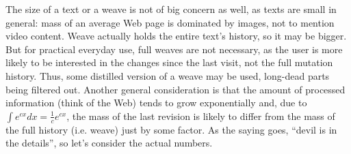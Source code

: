 \documentclass{acm_proc_article-sp}
\begin{document}
The size of a text or a weave is not of big concern as well,
as texts are small in general: mass of an average Web page
is dominated by images, not to mention video content.
Weave actually holds the entire text's history, so it may
be bigger. But for practical everyday use, full weaves are
not necessary, as the user is more likely to be interested
in the changes since the last visit, not the full mutation
history. Thus, some distilled version of a weave may be
used, long-dead parts being filtered out. Another general
consideration is that the amount of processed information
(think of the Web) tends to grow exponentially and, due to
$\int e^{cx}dx = \frac{1}{c} e^{cx}$, the mass of the last
revision is likely to differ from the mass of the full
history (i.e. weave) just by some factor. As the saying
goes, ``devil is in the details'', so let's consider the
actual numbers.
\end{document}
